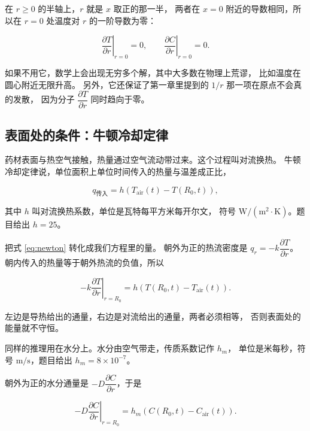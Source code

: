 在 $r\ge0$ 的半轴上，$r$ 就是 $x$ 取正的那一半，
两者在 $x=0$ 附近的导数相同，所以在 $r=0$ 处温度对 $r$ 的一阶导数为零：

\begin{equation}
\left.\frac{\partial T}{\partial r}\right|_{r=0}=0,
\qquad
\left.\frac{\partial C}{\partial r}\right|_{r=0}=0 .
\label{eq:sym}
\end{equation}

如果不用它，数学上会出现无穷多个解，其中大多数在物理上荒谬，
比如温度在圆心附近无限升高。
另外，它还保证了第一章里提到的 $1/r$ 那一项在原点不会真的发散，
因为分子 $\dfrac{\partial T}{\partial r}$ 同时趋向于零。

\subsection{表面处的条件：牛顿冷却定律}

药材表面与热空气接触，热量通过空气流动带过来。这个过程叫对流换热。
牛顿冷却定律说，单位面积上单位时间传入的热量与温差成正比，

\begin{equation}
q_{\text{传入}} = h\left(T_{\mathrm{air}}(t)-T(R_0,t)\right),
\label{eq:newton}
\end{equation}

其中 $h$ 叫对流换热系数，单位是瓦特每平方米每开尔文，
符号 $\mathrm{W/(m^2\cdot K)}$。题目给出 $h=25$。

把式 \eqref{eq:newton} 转化成我们方程里的量。
朝外为正的热流密度是 $q_r=-k\dfrac{\partial T}{\partial r}$。
朝内传入的热量等于朝外热流的负值，所以

\begin{equation}
-k\left.\frac{\partial T}{\partial r}\right|_{r=R_0}
= h\left(T(R_0,t)-T_{\mathrm{air}}(t)\right).
\label{eq:robinT}
\end{equation}

左边是导热给出的通量，右边是对流给出的通量，两者必须相等，
否则表面处的能量就不守恒。

同样的推理用在水分上。水分由空气带走，传质系数记作 $h_m$，
单位是米每秒，符号 $\mathrm{m/s}$，题目给出 $h_m=8\times10^{-7}$。

朝外为正的水分通量是 $-D\dfrac{\partial C}{\partial r}$，于是

\begin{equation}
-D\left.\frac{\partial C}{\partial r}\right|_{r=R_0}
= h_m\left(C(R_0,t)-C_{\mathrm{air}}(t)\right).
\label{eq:robinC}
\end{equation}

